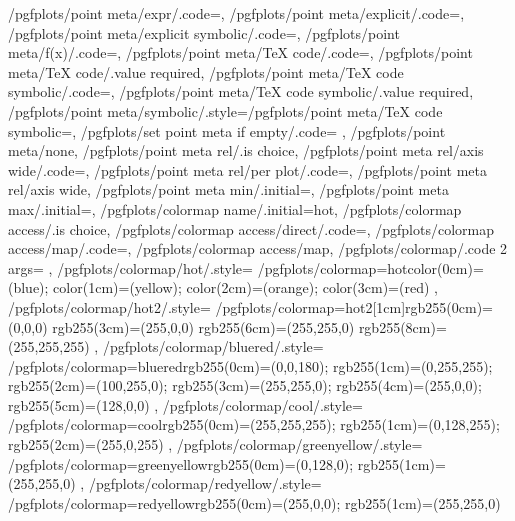 {	/pgfplots/point meta/expr/.code={},%
	/pgfplots/point meta/explicit/.code={},%
	/pgfplots/point meta/explicit symbolic/.code={},%
	/pgfplots/point meta/f(x)/.code={},%
	/pgfplots/point meta/TeX code/.code={},%
	/pgfplots/point meta/TeX code/.value required,
	/pgfplots/point meta/TeX code symbolic/.code={},%
	/pgfplots/point meta/TeX code symbolic/.value required,
	/pgfplots/point meta/symbolic/.style={/pgfplots/point meta/TeX code symbolic={\edef\pgfplotspointmeta{#1}}},
	/pgfplots/set point meta if empty/.code={%
		\ifx\pgfplotspointmetainputhandler\pgfutil@empty
		\fi
	},%
	/pgfplots/point meta/none,
	/pgfplots/point meta rel/.is choice,
	/pgfplots/point meta rel/axis wide/.code={\def\pgfplots@perpointmeta@rel@choice{0}},%
	/pgfplots/point meta rel/per plot/.code={\def\pgfplots@perpointmeta@rel@choice{1}},%
	/pgfplots/point meta rel/axis wide,%
	/pgfplots/point meta min/.initial=,%
	/pgfplots/point meta max/.initial=,%
	/pgfplots/colormap name/.initial=hot,
	/pgfplots/colormap access/.is choice,
	/pgfplots/colormap access/direct/.code={\def\pgfplots@colormap@access{d}},%
	/pgfplots/colormap access/map/.code={\def\pgfplots@colormap@access{m}},%
	/pgfplots/colormap access/map,%
	/pgfplots/colormap/.code 2 args={%
	},
	/pgfplots/colormap/hot/.style={
		/pgfplots/colormap={hot}{color(0cm)=(blue); color(1cm)=(yellow); color(2cm)=(orange); color(3cm)=(red)}
	},
 	/pgfplots/colormap/hot2/.style={
 		/pgfplots/colormap={hot2}{[1cm]rgb255(0cm)=(0,0,0) rgb255(3cm)=(255,0,0) rgb255(6cm)=(255,255,0) rgb255(8cm)=(255,255,255)}
 	},
	/pgfplots/colormap/bluered/.style={
		/pgfplots/colormap={bluered}{rgb255(0cm)=(0,0,180); rgb255(1cm)=(0,255,255); rgb255(2cm)=(100,255,0); rgb255(3cm)=(255,255,0); rgb255(4cm)=(255,0,0); rgb255(5cm)=(128,0,0)}
	},
	/pgfplots/colormap/cool/.style={
		/pgfplots/colormap={cool}{rgb255(0cm)=(255,255,255); rgb255(1cm)=(0,128,255); rgb255(2cm)=(255,0,255)}
	},
	/pgfplots/colormap/greenyellow/.style={
		/pgfplots/colormap={greenyellow}{rgb255(0cm)=(0,128,0); rgb255(1cm)=(255,255,0)}
	},
	/pgfplots/colormap/redyellow/.style={
		/pgfplots/colormap={redyellow}{rgb255(0cm)=(255,0,0); rgb255(1cm)=(255,255,0)}
}}
